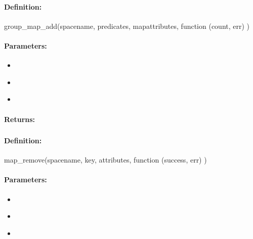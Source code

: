 \paragraph{Definition:}
\begin{javascriptcode}
group_map_add(spacename, predicates, mapattributes, function (count, err) {})
\end{javascriptcode}
\paragraph{Parameters:}
\begin{itemize}[noitemsep]
\item {}\\

\item {}\\

\item {}\\

\end{itemize}

\paragraph{Returns:}


\pagebreak
\subsubsection{}
\label{api:nodejs:map_remove}


\paragraph{Definition:}
\begin{javascriptcode}
map_remove(spacename, key, attributes, function (success, err) {})
\end{javascriptcode}
\paragraph{Parameters:}
\begin{itemize}[noitemsep]
\item {}\\

\item {}\\

\item {}\\

\end{itemize}


